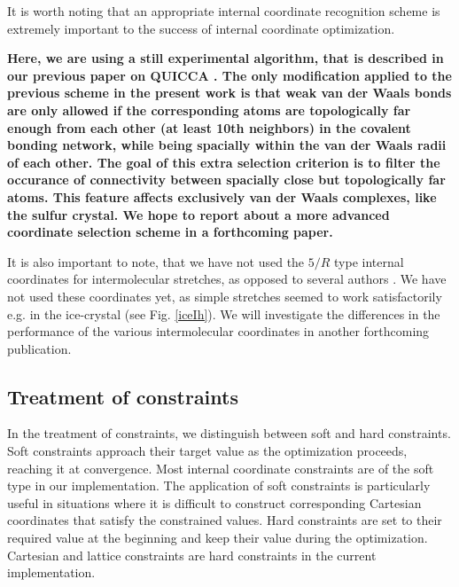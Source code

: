 \twolinestyle{\documentclass[prb,preprint]{revtex4}}
\begin{document}
It is worth noting that an appropriate internal coordinate 
recognition scheme is extremely important to the success of internal 
coordinate optimization.  
{\bf Here, we are using a still experimental algorithm, that is described
in our previous paper on QUICCA \cite{KNemeth04}. The only modification
applied to the previous scheme in the present work is that
weak van der Waals bonds are only allowed if the corresponding atoms
are topologically far enough from each other 
(at least 10th neighbors) in the covalent bonding
network, while being spacially within the van der Waals radii of 
each other. 
The goal
of this extra selection criterion is to filter the occurance of
connectivity between spacially close but topologically far atoms.
This feature affects 
exclusively van der Waals complexes, like the sulfur crystal. 
We hope to report about a more advanced coordinate selection scheme in
a forthcoming paper.

It is also important to note, that we have not used the $5/R$ type
internal coordinates for intermolecular stretches, as opposed to 
several authors \cite{JBaker00,TBucko05}. We have not used 
these coordinates yet, as simple stretches seemed to work satisfactorily
e.g. in the ice-crystal (see Fig. \ref{iceIh}). We will
investigate the differences in the performance of the various 
intermolecular coordinates in another forthcoming publication.
}

\subsection{Treatment of constraints}

In the treatment of  constraints, we distinguish between soft and hard constraints.
Soft constraints approach their target value as the optimization proceeds,  reaching it at 
convergence.  Most internal coordinate constraints are of the soft type in our implementation. 
The application of soft constraints is particularly useful in situations where it is difficult
to construct corresponding Cartesian coordinates that satisfy the constrained values.
Hard constraints are set to their required value  at the beginning and keep their value during 
the optimization.  Cartesian  and lattice constraints are hard constraints in the current 
implementation. 
\end{document}
